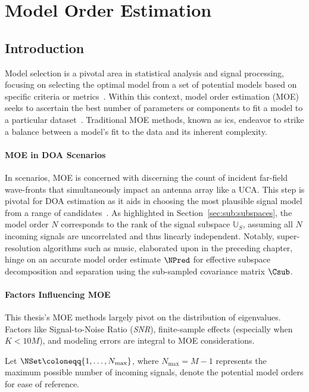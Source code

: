 \chapter{Model Order Estimation}
\label{ch:ModelOrderEstimation}

\section{Introduction}
Model selection is a pivotal area in statistical analysis and signal processing, focusing on selecting the optimal model from a set of potential models based on specific criteria or metrics~\cite{costa}.
Within this context, model order estimation (MOE) seeks to ascertain the best number of parameters or components to fit a model to a particular dataset~\cite{barthelme2020}.
Traditional MOE methods, known as \glspl{ic}, endeavor to strike a balance between a model's fit to the data and its inherent complexity.

\subsubsection*{MOE in DOA Scenarios}
In  scenarios, MOE is concerned with discerning the count of incident far-field wave-fronts that simultaneously impact an antenna array like a UCA. This step is pivotal for DOA estimation as it aids in choosing the most plausible signal model from a range of candidates~\cite{barthelme2020}.
As highlighted in Section~\ref{sec:sub:subspaces}, the model order \( N \) corresponds to the rank of the signal subspace \( \mathbb{U}_S \), assuming all \( N \) incoming signals are uncorrelated and thus linearly independent. Notably, super-resolution algorithms such as \gls{music}, elaborated upon in the preceding chapter, hinge on an accurate model order estimate \( \NPred \) for effective subspace decomposition and separation using the sub-sampled covariance matrix \( \Csub \).

\subsubsection*{Factors Influencing MOE}
This thesis's MOE methods largely pivot on the distribution of eigenvalues. Factors like Signal-to-Noise Ratio (\textit{SNR}), finite-sample effects (especially when \( K < 10M \)), and modeling errors are integral to MOE considerations.

Let \( \NSet \coloneqq \{1, \ldots, N_{\max}\} \), where \( N_{\max} = M - 1\) represents the maximum possible number of incoming signals, denote the potential model orders for ease of reference.

